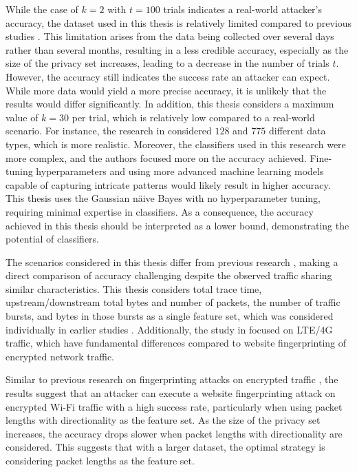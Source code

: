 While the case of $k=2$ with $t=100$ trials indicates a real-world attacker's accuracy, the dataset used in this thesis is relatively limited compared to previous studies \cite{DBLP:conf/sp/DyerCRS12, DBLP:conf/ctrsa/GellertJLN22, DBLP:conf/pet/GongBKS12, DBLP:conf/pet/Hintz02, kohls2019lost, DBLP:conf/pet/MillerHJT14, DBLP:conf/ccnc/MuehlsteinZBKDD17, DBLP:journals/popets/WangG16}. This limitation arises from the data being collected over several days rather than several months, resulting in a less credible accuracy, especially as the size of the privacy set increases, leading to a decrease in the number of trials $t$. However, the accuracy still indicates the success rate an attacker can expect. While more data would yield a more precise accuracy, it is unlikely that the results would differ significantly. In addition, this thesis considers a maximum value of $k=30$ per trial, which is relatively low compared to a real-world scenario. For instance, the research in \cite{DBLP:conf/sp/DyerCRS12} considered $128$ and $775$ different data types, which is more realistic. Moreover, the classifiers used in this research were more complex, and the authors focused more on the accuracy achieved. Fine-tuning hyperparameters and using more advanced machine learning models capable of capturing intricate patterns would likely result in higher accuracy. This thesis uses the Gaussian näive Bayes with no hyperparameter tuning, requiring minimal expertise in classifiers. As a consequence, the accuracy achieved in this thesis should be interpreted as a lower bound, demonstrating the potential of classifiers.

The scenarios considered in this thesis differ from previous research \cite{DBLP:conf/sp/DyerCRS12, kohls2019lost}, making a direct comparison of accuracy challenging despite the observed traffic sharing similar characteristics. This thesis considers total trace time, upstream/downstream total bytes and number of packets, the number of traffic bursts, and bytes in those bursts as a single feature set, which was considered individually in earlier studies \cite{DBLP:conf/sp/DyerCRS12}. Additionally, the study in \cite{kohls2019lost} focused on LTE/4G traffic, which have fundamental differences compared to website fingerprinting of encrypted network traffic.

Similar to previous research on fingerprinting attacks on encrypted traffic \cite{DBLP:conf/sp/DyerCRS12, DBLP:conf/ctrsa/GellertJLN22, DBLP:conf/pet/GongBKS12, DBLP:conf/pet/Hintz02, DBLP:conf/pet/MillerHJT14, DBLP:conf/ccnc/MuehlsteinZBKDD17, DBLP:journals/popets/WangG16}, the results suggest that an attacker can execute a website fingerprinting attack on encrypted Wi-Fi traffic with a high success rate, particularly when using packet lengths with directionality as the feature set. As the size of the privacy set increases, the accuracy drops slower when packet lengths with directionality are considered. This suggests that with a larger dataset, the optimal strategy is considering packet lengths as the feature set.

